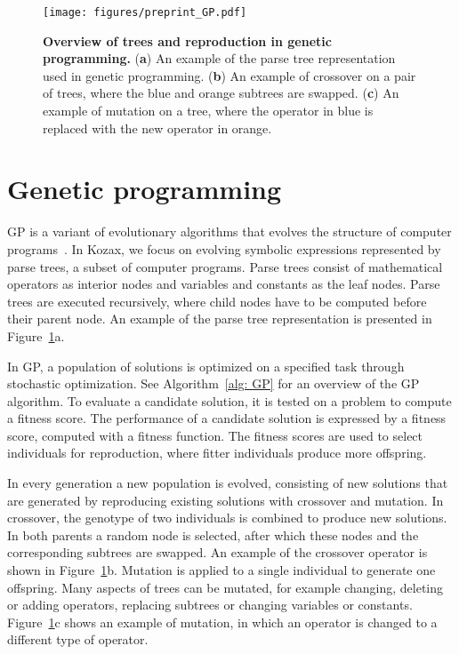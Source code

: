 \documentclass{article}
\begin{document}
\begin{figure}[t]  %
    \centering
    \texttt{[image: figures/preprint\_GP.pdf]} %
    \caption{\textbf{Overview of trees and reproduction in genetic programming.} (\textbf{a}) An example of the parse tree representation used in genetic programming. (\textbf{b}) An example of crossover on a pair of trees, where the blue and orange subtrees are swapped. (\textbf{c}) An example of mutation on a tree, where the operator in blue is replaced with the new operator in orange.}
    \label{fig: overview}
\end{figure}

\section{Genetic programming}\label{sec: GP}
GP is a variant of evolutionary algorithms that evolves the structure of computer programs~\cite{koza1994genetic}. In Kozax, we focus on evolving symbolic expressions represented by parse trees, a subset of computer programs. Parse trees consist of mathematical operators as interior nodes and variables and constants as the leaf nodes. Parse trees are executed recursively, where child nodes have to be computed before their parent node. An example of the parse tree representation is presented in Figure~\ref{fig: overview}a.

In GP, a population of solutions is optimized on a specified task through stochastic optimization. See Algorithm~\ref{alg: GP} for an overview of the GP algorithm. To evaluate a candidate solution, it is tested on a problem to compute a fitness score. The performance of a candidate solution is expressed by a fitness score, computed with a fitness function. The fitness scores are used to select individuals for reproduction, where fitter individuals produce more offspring.

In every generation a new population is evolved, consisting of new solutions that are generated by reproducing existing solutions with crossover and mutation. In crossover, the genotype of two individuals is combined to produce new solutions. In both parents a random node is selected, after which these nodes and the corresponding subtrees are swapped. An example of the crossover operator is shown in Figure~\ref{fig: overview}b. Mutation is applied to a single individual to generate one offspring. Many aspects of trees can be mutated, for example changing, deleting or adding operators, replacing subtrees or changing variables or constants. Figure~\ref{fig: overview}c shows an example of mutation, in which an operator is changed to a different type of operator.
\end{document}
